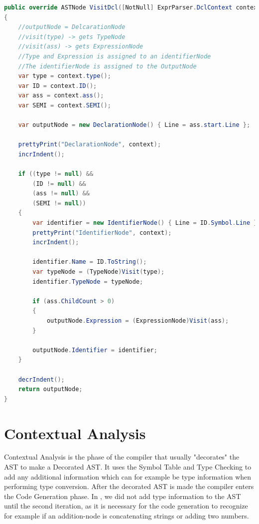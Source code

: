 \begin{lstlisting}[language = csharp, firstnumber=132, label={list:BuildASTVisitor},caption=BuildASTVisitor Class - CobraCompiler/BuildASTVisitor.cs]
public override ASTNode VisitDcl([NotNull] ExprParser.DclContext context)
{
    //outputNode = DelcarationNode
    //visit(type) -> gets TypeNode
    //visit(ass) -> gets ExpressionNode
    //Type and Expression is assigned to an identifierNode
    //The identifierNode is assigned to the OutputNode
    var type = context.type();
    var ID = context.ID();
    var ass = context.ass();
    var SEMI = context.SEMI();

    var outputNode = new DeclarationNode() { Line = ass.start.Line };

    prettyPrint("DeclarationNode", context);
    incrIndent();

    if ((type != null) &&
        (ID != null) &&
        (ass != null) &&
        (SEMI != null))
    {
        var identifier = new IdentifierNode() { Line = ID.Symbol.Line };
        prettyPrint("IdentifierNode", context);
        incrIndent();

        identifier.Name = ID.ToString();
        var typeNode = (TypeNode)Visit(type);
        identifier.TypeNode = typeNode;

        if (ass.ChildCount > 0)
        {
            outputNode.Expression = (ExpressionNode)Visit(ass);
        }

        outputNode.Identifier = identifier;
    }

    decrIndent();
    return outputNode;
}
\end{lstlisting}

\newpage
\section{Contextual Analysis}\label{I:ContextualAnalysis}
Contextual Analysis is the phase of the compiler that usually "decorates" the AST to make a Decorated AST. It uses the Symbol Table and Type Checking to add any additional information which can for example be type information when performing type conversion. After the decorated AST is made the compiler enters the Code Generation phase. In \lang, we did not add type information to the AST until the second iteration, as it is necessary for the code generation to recognize for example if an addition-node is concatenating strings or adding two numbers.

